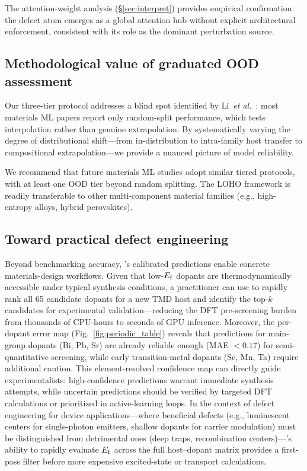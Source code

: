 The attention-weight analysis (\S\ref{sec:interpret}) provides empirical
confirmation: the defect atom emerges as a global attention hub without
explicit architectural enforcement, consistent with its role as the dominant
perturbation source.

\subsection{Methodological value of graduated OOD assessment}

Our three-tier protocol addresses a blind spot identified by
Li~\textit{et al.}~\cite{li2025ood}: most materials ML papers report only
random-split performance, which tests interpolation rather than genuine
extrapolation.
By systematically varying the degree of distributional shift---from
in-distribution to intra-family host transfer to compositional
extrapolation---we provide a nuanced picture of model reliability.

We recommend that future materials ML studies adopt similar tiered
protocols, with at least one OOD tier beyond random splitting.
The LOHO framework is readily transferable to other multi-component
material families (e.g., high-entropy alloys, hybrid perovskites).

\subsection{Toward practical defect engineering}

Beyond benchmarking accuracy, \dart{}'s calibrated predictions enable
concrete materials-design workflows.
Given that low-$E_\mathrm{f}$ dopants are thermodynamically accessible under
typical synthesis conditions, a practitioner can use \dart{} to rapidly
rank all 65 candidate dopants for a new TMD host and identify the
top-$k$ candidates for experimental validation---reducing the DFT
pre-screening burden from thousands of CPU-hours to seconds of GPU
inference.
%
Moreover, the per-dopant error map (Fig.~\ref{fig:periodic_table})
reveals that predictions for main-group dopants (Bi, Pb, Sr) are
already reliable enough (MAE $< 0.17$\eV{}) for semi-quantitative
screening, while early transition-metal dopants (Sc, Mn, Ta) require
additional caution.
This element-resolved confidence map can directly guide experimentalists:
high-confidence predictions warrant immediate synthesis attempts, while
uncertain predictions should be verified by targeted DFT calculations
or prioritized in active-learning loops.
%
In the context of defect engineering for device applications---where
beneficial defects (e.g., luminescent centers for single-photon emitters,
shallow dopants for carrier modulation) must be distinguished from
detrimental ones (deep traps, recombination centers)---\dart{}'s
ability to rapidly evaluate $E_\mathrm{f}$ across the full host--dopant matrix
provides a first-pass filter before more expensive excited-state or
transport calculations.

